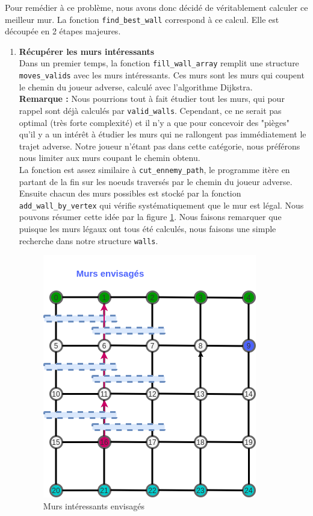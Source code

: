 \documentclass[a4paper]{article}
\begin{document}
Pour remédier à ce problème, nous avons donc décidé de véritablement calculer ce meilleur mur. La fonction \texttt{find\_best\_wall} correspond à ce calcul. Elle est découpée en 2 étapes majeures. \\

\begin{enumerate}
    \item \textbf{Récupérer les murs intéressants} \\
Dans un premier temps, la fonction \texttt{fill\_wall\_array} remplit une structure \texttt{moves\_valids} avec les murs intéressants. Ces murs sont les murs qui coupent le chemin du joueur adverse, calculé avec l'algorithme Dijkstra. \\ 

\textbf{Remarque :} Nous pourrions tout à fait étudier tout les murs, qui pour rappel sont déjà calculés par \texttt{valid\_walls}. Cependant, ce ne serait pas optimal (très forte complexité) et il n'y a que pour concevoir des "pièges" qu'il y a un intérêt à étudier les murs qui ne rallongent pas immédiatement le trajet adverse. Notre joueur n'étant pas dans cette catégorie, nous préférons nous limiter aux murs coupant le chemin obtenu. \\

La fonction est assez similaire à \texttt{cut\_ennemy\_path}, le programme itère en partant de la fin sur les noeuds traversés par le chemin du joueur adverse. Ensuite chacun des murs possibles est stocké par la fonction \texttt{add\_wall\_by\_vertex} qui vérifie systématiquement que le mur est légal. Nous pouvons résumer cette idée par la figure \ref{fig:cut_path5}. Nous faisons remarquer que puisque les murs légaux ont tous été calculés, nous faisons une simple recherche dans notre structure \texttt{walls}. \\ 

\begin{figure}[h!]
    \centering
    \includegraphics[scale=0.6]{cut_path5.png}
    \caption{Murs intéressants envisagés}
    \label{fig:cut_path5}
\end{figure}


\end{enumerate}
\end{document}
